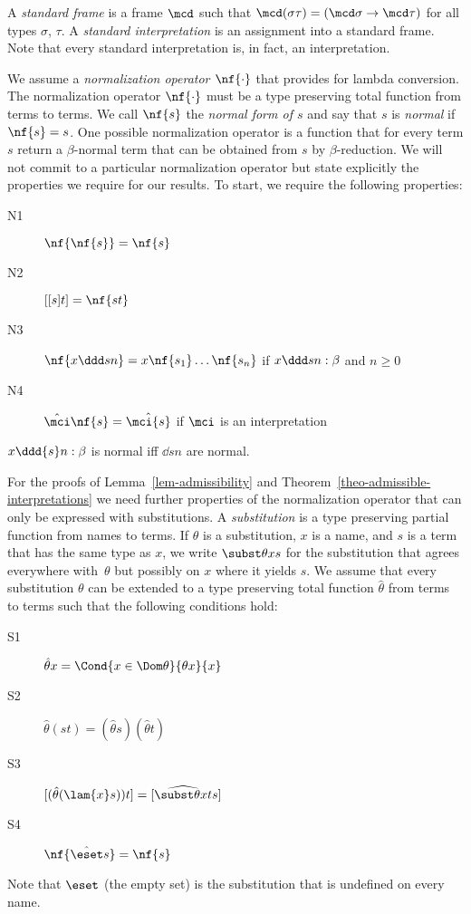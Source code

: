 A \emph{standard frame} is a frame $\mcd$ such that
$\mcd(\sigma\tau)=(\mcd\sigma\to\mcd\tau)$ for all
types $\sigma$, $\tau$.  A \emph{standard
  interpretation} is an assignment into a standard
frame.  Note that every standard interpretation is, in fact, an
interpretation.

We assume a \emph{normalization operator $\nf{\cdot}$} that provides for lambda conversion.  The normalization
operator $\nf{\cdot}$ must be a type preserving total function from terms to terms.  We call $\nf{s}$ the
\emph{normal form of $s$} and say that $s$ is
\emph{normal} if $\nf{s}=s$.  One possible
normalization operator is a function that for every
term $s$ return a $\beta$-normal term that can be
obtained from $s$ by $\beta$-reduction.  We will not
commit to a particular normalization operator but state
explicitly the properties we require for our results.
To start, we require the following properties:
\begin{description}
\item[{N1}~] $\nf{\nf{s}}=\nf{s}$
\item[{N2}~] $[[s]t]=\nf{st}$
\item[{N3}~] $\nf{x\ddd s n}=x\nf{s_1}\dots\nf{s_n}$ 
  \quad if $x\ddd s n:\beta$ and $n\ge0$
\item[{N4}~] $\hat\mci\nf{s}=\hat\mci{s}$
  \quad if $\mci$ is an interpretation
\end{description}

\begin{prop}
  $x\ddd{s}n:\beta$ is normal iff $\dd{s}n$ are normal.
\end{prop}



For the proofs of Lemma~\ref{lem-admissibility} and
Theorem~\ref{theo-admissible-interpretations} we need
further properties of the normalization operator that
can only be expressed with substitutions.  A
\emph{substitution} is a type preserving partial
function from names to terms.  If $\theta$ is a
substitution, $x$ is a name, and $s$ is a term that has
the same type as $x$, we write \emph{$\subst\theta x
  s$} for the substitution that agrees everywhere
with~$\theta$ but possibly on $x$ where it yields $s$.
We assume that every substitution $\theta$ can be
extended to a type preserving total function
\emph{$\hat\theta$} from terms to terms such that the
following conditions hold:
\enlargethispage*{5mm} \begin{description}
\item[{S1}~] $\hat\theta x=\Cond{x\in\Dom\theta}{\theta{x}}{x}$
\item[{S2}~] $\hat\theta(st)=(\hat\theta{s})(\hat\theta{t})$
\item[{S3}~] $[(\hat\theta(\lam{x}s){})t]=[\widehat{\subst\theta{x}t}s]$
\item[{S4}~] $\nf{\hat\eset s}=\nf{s}$
\end{description}
Note that $\eset$ (the empty set) is the substitution
that is undefined on every name.

